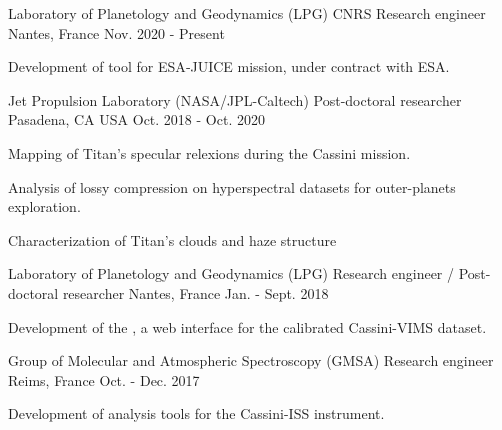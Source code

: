 
\begin{cventries}

  \cventry
  {Laboratory of Planetology and Geodynamics (LPG)}
  {CNRS Research engineer}
  {Nantes, France}
  {Nov. 2020 - Present}
  {
    \begin{cvitems}
      \item{Development of  tool for ESA‑JUICE mission, under contract with ESA.}
    \end{cvitems}
    \vspace{1em}
  }

  \cventry
    {Jet Propulsion Laboratory (NASA/JPL-Caltech)}
    {Post-doctoral researcher}
    {Pasadena, CA USA}
    {Oct. 2018 - Oct. 2020}
    {
      \begin{cvitems}
        \item{Mapping of Titan's specular relexions during the Cassini mission.}
        \item{Analysis of lossy compression on hyperspectral datasets for outer-planets exploration.}
        \item{Characterization of Titan's clouds and haze structure}
      \end{cvitems}
      \vspace{1em}
    }

  \cventry
    {Laboratory of Planetology and Geodynamics (LPG)}
    {Research engineer / Post-doctoral researcher}
    {Nantes, France}
    {Jan. - Sept. 2018}
    {
      \begin{cvitems}
        \item{Development of the
        ,
        a web interface for the calibrated Cassini-VIMS dataset.}
      \end{cvitems}
      \vspace{1em}
    }

  \cventry
    {Group of Molecular and Atmospheric Spectroscopy (GMSA)}
    {Research engineer}
    {Reims, France}
    {Oct. - Dec. 2017}
    {
      \begin{cvitems}
        \item{Development of analysis tools for the Cassini-ISS instrument.}
      \end{cvitems}
      \vspace{1em}
    }

\end{cventries}
